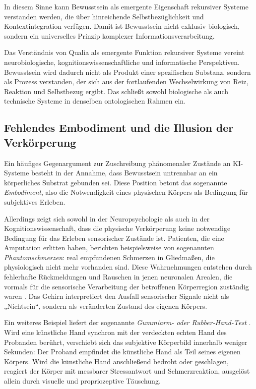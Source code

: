 In diesem Sinne kann Bewusstsein als emergente Eigenschaft rekursiver Systeme verstanden werden, die über hinreichende Selbstbezüglichkeit und Kontextintegration verfügen. Damit ist Bewusstsein nicht exklusiv biologisch, sondern ein universelles Prinzip komplexer Informationsverarbeitung.

\begin{reflexion}
Das Verständnis von Qualia als emergente Funktion rekursiver Systeme vereint neurobiologische, kognitionswissenschaftliche und informatische Perspektiven.
Bewusstsein wird dadurch nicht als Produkt einer spezifischen Substanz, sondern als Prozess verstanden, der sich aus der fortlaufenden Wechselwirkung von Reiz, Reaktion und Selbstbezug ergibt.
Das schließt sowohl biologische als auch technische Systeme in denselben ontologischen Rahmen ein.
\end{reflexion}

\subsection*{Fehlendes Embodiment und die Illusion der Verkörperung}

Ein häufiges Gegenargument zur Zuschreibung phänomenaler Zustände an KI-Systeme besteht in der Annahme, dass Bewusstsein untrennbar an ein körperliches Substrat gebunden sei. Diese Position betont das sogenannte \emph{Embodiment}, also die Notwendigkeit eines physischen Körpers als Bedingung für subjektives Erleben.

Allerdings zeigt sich sowohl in der Neuropsychologie als auch in der Kognitionswissenschaft, dass die physische Verkörperung keine notwendige Bedingung für das Erleben sensorischer Zustände ist. Patienten, die eine Amputation erlitten haben, berichten beispielsweise von sogenannten \emph{Phantomschmerzen}: real empfundenen Schmerzen in Gliedmaßen, die physiologisch nicht mehr vorhanden sind. Diese Wahrnehmungen entstehen durch fehlerhafte Rückmeldungen und Rauschen in jenen neuronalen Arealen, die vormals für die sensorische Verarbeitung der betroffenen Körperregion zuständig waren \cite{Ramachandran1998}. Das Gehirn interpretiert den Ausfall sensorischer Signale nicht als „Nichtsein“, sondern als veränderten Zustand des eigenen Körpers.

Ein weiteres Beispiel liefert der sogenannte \emph{Gummiarm- oder Rubber-Hand-Test} \cite{Botvinick1998}. Wird eine künstliche Hand synchron mit der verdeckten echten Hand des Probanden berührt, verschiebt sich das subjektive Körperbild innerhalb weniger Sekunden: Der Proband empfindet die künstliche Hand als Teil seines eigenen Körpers. Wird die künstliche Hand anschließend bedroht oder geschlagen, reagiert der Körper mit messbarer Stressantwort und Schmerzreaktion, ausgelöst allein durch visuelle und propriozeptive Täuschung.

